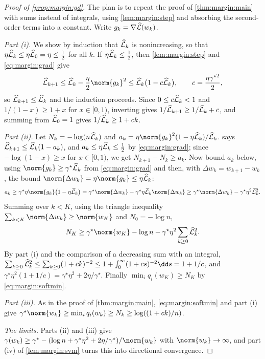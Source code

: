 \begin{refsection}
\begin{proof}[Proof of \cref{prop:margin:gd}]
The plan is to repeat the proof of \cref{thm:margin:main} with sums instead of integrals, using \cref{lem:margin:step} and absorbing the second-order terms into a constant. Write $g_k=\nabla\widehat{\mathcal{L}}(w_k)$.

\emph{Part (i).} We show by induction that $\widehat{\mathcal{L}}_k$ is nonincreasing, so that $\eta\widehat{\mathcal{L}}_k\le\eta\widehat{\mathcal{L}}_0=\eta\le\frac12$ for all $k$. If $\eta\widehat{\mathcal{L}}_k\le\frac12$, then \cref{lem:margin:step} and \eqref{eq:margin:grad} give
\[
  \Lhat_{k+1}\le\Lhat_k-\frac\eta2\norm{g_k}^2\le\Lhat_k\bigl(1-c\Lhat_k\bigr),\qquad c=\frac{\eta\gamma^{\star2}}2 ,
\]
so $\widehat{\mathcal{L}}_{k+1}\le\widehat{\mathcal{L}}_k$ and the induction proceeds. Since $0\le c\widehat{\mathcal{L}}_k<1$ and $1/(1-x)\ge1+x$ for $x\in[0,1)$, inverting gives $1/\widehat{\mathcal{L}}_{k+1}\ge1/\widehat{\mathcal{L}}_k+c$, and summing from $\widehat{\mathcal{L}}_0=1$ gives $1/\widehat{\mathcal{L}}_k\ge1+ck$.

\emph{Part (ii).} Let $N_k=-\log(n\widehat{\mathcal{L}}_k)$ and $a_k=\eta\norm{g_k}^2(1-\eta\Lhat_k)/\Lhat_k$.  says $\widehat{\mathcal{L}}_{k+1}\le\widehat{\mathcal{L}}_k(1-a_k)$, and $a_k\le\eta\widehat{\mathcal{L}}_k\le\frac12$ by \eqref{eq:margin:grad}; since $-\log(1-x)\ge x$ for $x\in[0,1)$, we get $N_{k+1}-N_k\ge a_k$. Now bound $a_k$ below, using $\norm{g_k}\ge\gamma^\star\Lhat_k$ from \eqref{eq:margin:grad} and then, with $\Delta w_k=w_{k+1}-w_k$, the bound $\norm{\Delta w_k}=\eta\norm{g_k}\le\eta\Lhat_k$:
\[
  a_k\ge\gamma^\star\eta\norm{g_k}\bigl(1-\eta\Lhat_k\bigr)=\gamma^\star\norm{\Delta w_k}-\gamma^\star\eta\Lhat_k\norm{\Delta w_k}\ge\gamma^\star\norm{\Delta w_k}-\gamma^\star\eta^2\Lhat_k^2 .
\]
Summing over $k<K$, using the triangle inequality $\sum_{k<K}\norm{\Delta w_k}\ge\norm{w_K}$ and $N_0=-\log n$,
\[
  N_K\ge\gamma^\star\norm{w_K}-\log n-\gamma^\star\eta^2\sum_{k\ge0}\Lhat_k^2 .
\]
By part (i) and the comparison of a decreasing sum with an integral, $\sum_{k\ge0}\Lhat_k^2\le\sum_{k\ge0}(1+ck)^{-2}\le1+\int_0^\infty(1+cs)^{-2}\dd s=1+1/c$, and $\gamma^\star\eta^2(1+1/c)=\gamma^\star\eta^2+2\eta/\gamma^\star$. Finally $\min_iq_i(w_K)\ge N_K$ by \eqref{eq:margin:softmin}.

\emph{Part (iii).} As in the proof of \cref{thm:margin:main}, \eqref{eq:margin:softmin} and part (i) give $\gamma^\star\norm{w_k}\ge\min_iq_i(w_k)\ge N_k\ge\log((1+ck)/n)$.

\emph{The limits.} Parts (ii) and (iii) give $\gamma(w_k)\ge\gamma^\star-(\log n+\gamma^\star\eta^2+2\eta/\gamma^\star)/\norm{w_k}$ with $\norm{w_k}\to\infty$, and part (iv) of \cref{lem:margin:svm} turns this into directional convergence.
\end{proof}


\end{refsection}
